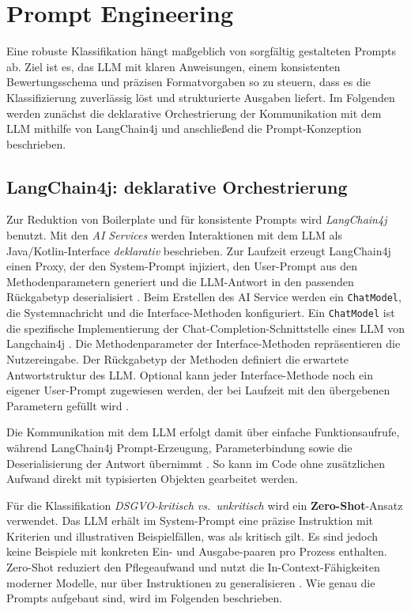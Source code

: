 \section{Prompt Engineering}\label{sec:prompt-engineering}

Eine robuste Klassifikation hängt maßgeblich von sorgfältig gestalteten Prompts ab. Ziel ist es, das \ac{LLM} mit klaren Anweisungen, einem konsistenten Bewertungsschema und präzisen Formatvorgaben so zu steuern, dass es die Klassifizierung zuverlässig löst und strukturierte Ausgaben liefert. Im Folgenden werden zunächst die deklarative Orchestrierung der Kommunikation mit dem \ac{LLM} mithilfe von LangChain4j und anschließend die Prompt-Konzeption beschrieben.

\subsection*{LangChain4j: deklarative Orchestrierung}
Zur Reduktion von Boilerplate und für konsistente Prompts wird \emph{LangChain4j} \cite{langchain4j} benutzt. Mit den \emph{AI Services} werden Interaktionen mit dem \ac{LLM} als Java/Kotlin-Interface \emph{deklarativ} beschrieben. Zur Laufzeit erzeugt LangChain4j einen Proxy, der den System-Prompt injiziert, den User-Prompt aus den Methodenparametern generiert und die \ac{LLM}-Antwort in den passenden Rückgabetyp deserialisiert \cite{langchain4j-ai-services}. Beim Erstellen des AI Service werden ein \texttt{ChatModel}, die Systemnachricht und die Interface-Methoden konfiguriert. Ein \texttt{ChatModel} ist die spezifische Implementierung der Chat-Completion-Schnittstelle eines \ac{LLM} von Langchain4j \cite{langchain4j-chat-model}. Die Methodenparameter der Interface-Methoden repräsentieren die Nutzereingabe. Der Rückgabetyp der Methoden definiert die erwartete Antwortstruktur des \ac{LLM}. Optional kann jeder Interface-Methode noch ein eigener User-Prompt zugewiesen werden, der bei Laufzeit mit den übergebenen Parametern gefüllt wird \cite{langchain4j-ai-services}.

Die Kommunikation mit dem \ac{LLM} erfolgt damit über einfache Funktionsaufrufe, während LangChain4j Prompt-Erzeugung, Parameterbindung sowie die Deserialisierung der Antwort übernimmt \cite{langchain4j-ai-services}. So kann im Code ohne zusätzlichen Aufwand direkt mit typisierten Objekten gearbeitet werden.

Für die Klassifikation \emph{\ac{DSGVO}-kritisch vs.\ unkritisch} wird ein \textbf{Zero-Shot}-Ansatz verwendet. Das \ac{LLM} erhält im System-Prompt eine präzise Instruktion mit Kriterien und illustrativen Beispielfällen, was als kritisch gilt. Es sind jedoch keine Beispiele mit konkreten Ein- und Ausgabe-paaren pro Prozess enthalten. Zero-Shot reduziert den Pflegeaufwand und nutzt die In-Context-Fähigkeiten moderner Modelle, nur über Instruktionen zu generalisieren \cite{brown2020fewshot,liu2023prompting}. Wie genau die Prompts aufgebaut sind, wird im Folgenden beschrieben.

